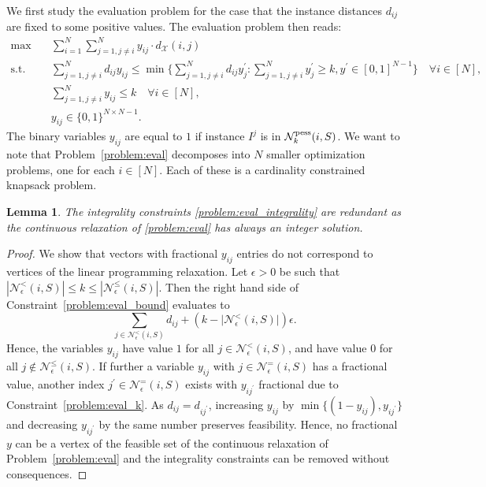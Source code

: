 \documentclass[11pt, a4paper]{article}
\newtheorem{lemma}{Lemma}
\newcommand{\FRil}[1]{\todo[color=black, textcolor=white, inline, author=FR]{#1}}
\newcommand{\X}{{\mathcal{X}}} %
\newcommand{\instanceindex}{i}
\newcommand{\instanceindextwo}{j}
\newcommand{\fsel}{S} %
\newcommand{\selectionset}{\fsel}
\newcommand{\soldist}[1][(\instanceindex,\instanceindextwo)]{d_\X#1} %
\newcommand{\neighbour}{\ensuremath{\mathcal{N}}}
\newcommand{\sEpsStrict}[1][(\instanceindex,\selectionset)]{\ensuremath{\neighbour^<_\epsilon#1}}
\newcommand{\sEpsBorder}[1][(\instanceindex,\selectionset)]{\ensuremath{\neighbour^=_\epsilon#1}}
\newcommand{\sEpsNeighbour}[1][(\instanceindex,\selectionset)]{\ensuremath{\neighbour^\le_\epsilon#1}}
\newcommand{\skPess}[1][(\instanceindex,\selectionset)]{\neighbour_k^\textnormal{pess}#1}
\begin{document}
We first study the evaluation problem for the case that the instance distances $d_{ij}$ are fixed to some positive values.
The evaluation problem then reads:
\begin{subequations}\label{problem:eval}
	\begin{align}
		\max \quad & \sum_{i=1}^N \sum_{j=1, j\neq i}^Ny_{ij} \cdot \soldist \\
		\label{problem:eval_bound}\text{s.t.}\quad & \sum_{j=1, j\neq i}^N d_{ij}y_{ij} \leq \min \Big\{ \sum_{j=1, j\neq i}^N d_{ij}y^\prime_{j} \colon \sum_{j=1, j\neq i}^N y^\prime_j \geq k, y^\prime \in [0,1]^{N-1} \Big\} \quad \forall i\in [N],\\
		\label{problem:eval_k}& \sum_{j=1,j\neq i}^N y_{ij} \leq k \quad \forall i\in [N],\\
		\label{problem:eval_integrality}& y_{ij}\in \{0, 1\}^{N \times N-1}.
	\end{align}
\end{subequations}
The binary variables $y_{ij}$ are equal to $1$ if instance $I^j$ is in $\skPess$.  
We want to note that Problem~\eqref{problem:eval} decomposes into $N$ smaller optimization problems, one for each $i \in [N]$. Each of these is a cardinality constrained knapsack problem.
\begin{lemma}
	The integrality constraints \eqref{problem:eval_integrality} are redundant as the continuous relaxation of \eqref{problem:eval} has always an integer solution.
\end{lemma}
\begin{proof}
We show that vectors with fractional $y_{ij}$ entries do not
  correspond to vertices of the linear programming relaxation.
	Let $\epsilon > 0$ be such that $ |\sEpsStrict| \leq k \leq |\sEpsNeighbour|$. Then the right hand side of Constraint~\eqref{problem:eval_bound} evaluates to
	\begin{equation*}
		\sum_{j \in \sEpsStrict} d_{ij} + (k - \lvert \sEpsStrict \rvert) \epsilon.
	\end{equation*}
	Hence, the variables $y_{ij}$ have value $1$ for all $j \in \sEpsStrict$, and have value $0$ for all $j\notin \sEpsNeighbour$.
	If further a variable $y_{ij}$ with $j \in \sEpsBorder$ has a fractional value, another index $j^\prime \in \sEpsBorder$ exists with $y_{ij^\prime}$ fractional due to Constraint~\eqref{problem:eval_k}. As $d_{ij} = d_{ij^\prime}$, increasing $y_{ij}$ by $\min\{(1 - y_{ij}), y_{ij^\prime}\}$ and decreasing $y_{ij^\prime}$ by the same number preserves feasibility. Hence, no fractional $y$ can be a vertex of the feasible set of the continuous relaxation of Problem~\eqref{problem:eval} and the integrality constraints can be removed without consequences.
\end{proof}
\end{document}
